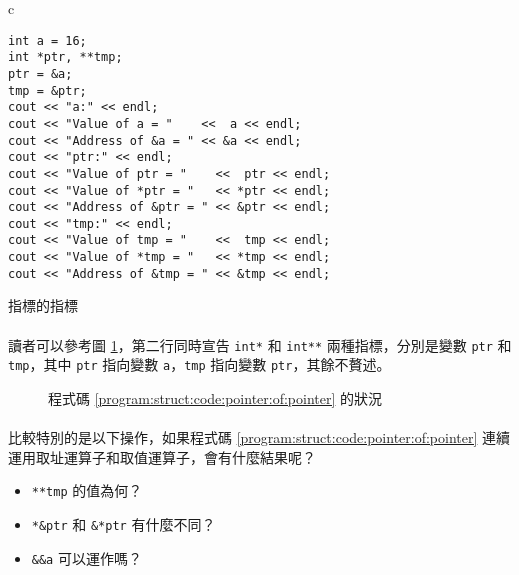 \documentclass[12pt,a4paper,oneside]{report}
\begin{document}
\begin{CJK}{UTF8}{bkai}
\begin{code}[h!]
\centering
\begin{tabular}{c}
\begin{lstlisting}
int a = 16;
int *ptr, **tmp;
ptr = &a;
tmp = &ptr;
cout << "a:" << endl;
cout << "Value of a = "    <<  a << endl;
cout << "Address of &a = " << &a << endl;
cout << "ptr:" << endl;
cout << "Value of ptr = "    <<  ptr << endl;
cout << "Value of *ptr = "   << *ptr << endl;
cout << "Address of &ptr = " << &ptr << endl;
cout << "tmp:" << endl;
cout << "Value of tmp = "    <<  tmp << endl;
cout << "Value of *tmp = "   << *tmp << endl;
cout << "Address of &tmp = " << &tmp << endl;
\end{lstlisting}
\end{tabular}
\caption{指標的指標}
\label{program:struct:code:pointer:of:pointer}
\end{code}

\paragraph{}讀者可以參考圖 \ref{program:struct:fig:pointer:of:pointer}，第二行同時宣告 \lstinline!int*! 和 \lstinline!int**! 兩種指標，分別是變數 \lstinline!ptr! 和 \lstinline!tmp!，其中 \lstinline!ptr! 指向變數 \lstinline!a!，\lstinline!tmp! 指向變數 \lstinline!ptr!，其餘不贅述。

\begin{figure}[h!]
\centering
{}
\caption{程式碼 \ref{program:struct:code:pointer:of:pointer} 的狀況}
\label{program:struct:fig:pointer:of:pointer}
\end{figure}

\paragraph{}比較特別的是以下操作，如果程式碼 \ref{program:struct:code:pointer:of:pointer} 連續運用取址運算子和取值運算子，會有什麼結果呢？
\begin{itemize}
\item \lstinline!**tmp! 的值為何？
\item \lstinline!*&ptr! 和 \lstinline!&*ptr! 有什麼不同？
\item \lstinline!&&a! 可以運作嗎？
\end{itemize}


\end{CJK}
\end{document}
